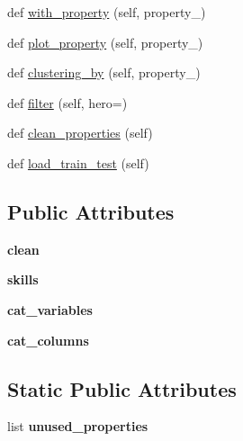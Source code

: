 \begin{DoxyCompactItemize}
\item 
def \hyperlink{classabilities__old_1_1_abilities_aeb7d8464a0602ea1d4d609ce5768503c}{with\+\_\+property} (self, property\+\_\+)
\item 
def \hyperlink{classabilities__old_1_1_abilities_aabde6ec2cd2b12d2c4d4c80668bf33ef}{plot\+\_\+property} (self, property\+\_\+)
\item 
def \hyperlink{classabilities__old_1_1_abilities_a55c7dacd26fee941351455b7e4d6b7ee}{clustering\+\_\+by} (self, property\+\_\+)
\item 
def \hyperlink{classabilities__old_1_1_abilities_a82177be3ef5289b07d8ff7518aafcd53}{filter} (self, hero=\textquotesingle{}\textquotesingle{})
\item 
def \hyperlink{classabilities__old_1_1_abilities_adee377f2dfd5475c34dbc4f38a5b9986}{clean\+\_\+properties} (self)
\item 
def \hyperlink{classabilities__old_1_1_abilities_a076fa41cc24e0d38a60b6ac05d5bc71c}{load\+\_\+train\+\_\+test} (self)
\end{DoxyCompactItemize}
\subsection*{Public Attributes}
\begin{DoxyCompactItemize}
\item 
{\bfseries clean}\hypertarget{classabilities__old_1_1_abilities_a0a2945d4991378621525537d4d063213}{}\label{classabilities__old_1_1_abilities_a0a2945d4991378621525537d4d063213}

\item 
{\bfseries skills}\hypertarget{classabilities__old_1_1_abilities_a4ae268d5203f7c3764eb4e0416e76beb}{}\label{classabilities__old_1_1_abilities_a4ae268d5203f7c3764eb4e0416e76beb}

\item 
{\bfseries cat\+\_\+variables}\hypertarget{classabilities__old_1_1_abilities_ac50027edecd717d123c38b3743922407}{}\label{classabilities__old_1_1_abilities_ac50027edecd717d123c38b3743922407}

\item 
{\bfseries cat\+\_\+columns}\hypertarget{classabilities__old_1_1_abilities_aee9f9cc37afb798dc810928c9275a238}{}\label{classabilities__old_1_1_abilities_aee9f9cc37afb798dc810928c9275a238}

\end{DoxyCompactItemize}
\subsection*{Static Public Attributes}
\begin{DoxyCompactItemize}
\item 
list {\bfseries unused\+\_\+properties}
\end{DoxyCompactItemize}


